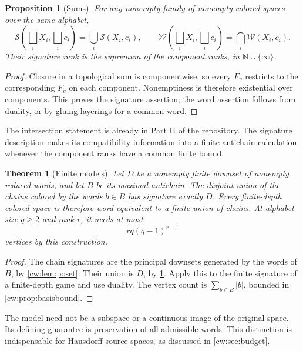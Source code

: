 \documentclass[11pt,letterpaper]{article}
\numberwithin{equation}{section}
\newtheorem{theorem}{Theorem}[section]
\newtheorem{proposition}[proposition]{Proposition}
\theoremstyle{definition}
\theoremstyle{remark}
\theoremstyle{definition}
\newcommand{\N}{\mathbb N}
\newcommand{\W}{\mathcal W}
\newcommand{\len}[1]{\lvert #1\rvert}
\newcommand{\cwSig}{\mathcal S}
\begin{document}
\begin{proposition}[Sums]\label{cw:prop:sums}
For any nonempty family of nonempty colored spaces over the same alphabet,
\begin{equation}\label{cw:eq:sums}
 \cwSig\left(\bigsqcup_i X_i,\bigsqcup_i c_i\right)=\bigcup_i\cwSig(X_i,c_i),
 \qquad
 \W\left(\bigsqcup_i X_i,\bigsqcup_i c_i\right)=\bigcap_i\W(X_i,c_i).
\end{equation}
Their signature rank is the supremum of the component ranks, in
$\N\cup\{\infty\}$.
\end{proposition}
\begin{proof}
Closure in a topological sum is componentwise, so every $F_v$ restricts to
the corresponding $F_v$ on each component. Nonemptiness is therefore
existential over components. This proves the signature assertion; the word
assertion follows from duality, or by gluing layerings for a common word.
\end{proof}

The intersection statement is already in Part II of the repository. The
signature description makes its compatibility information into a finite
antichain calculation whenever the component ranks have a common finite bound.

\begin{theorem}[Finite models]\label{cw:thm:finitemodel}
Let $D$ be a nonempty finite downset of nonempty reduced words, and let
$B$ be its maximal antichain. The disjoint union of the chains colored by
the words $b\in B$ has signature exactly $D$. Every finite-depth colored
space is therefore word-equivalent to a finite union of chains. At alphabet
size $q\ge2$ and rank $r$, it needs at most
\begin{equation}\label{cw:eq:finitevertices}
 rq(q-1)^{r-1}
\end{equation}
vertices by this construction.
\end{theorem}
\begin{proof}
The chain signatures are the principal downsets generated by the words of
$B$, by \cref{cw:lem:poset}. Their union is $D$, by \cref{cw:prop:sums}.
Apply this to the finite signature of a finite-depth game and use duality.
The vertex count is $\sum_{b\in B}\len b$, bounded in
\cref{cw:prop:basisbound}.
\end{proof}

The model need not be a subspace or a continuous image of the original
space. Its defining guarantee is preservation of all admissible words.
This distinction is indispensable for Hausdorff source spaces, as discussed
in \cref{cw:sec:budget}.
\end{document}
